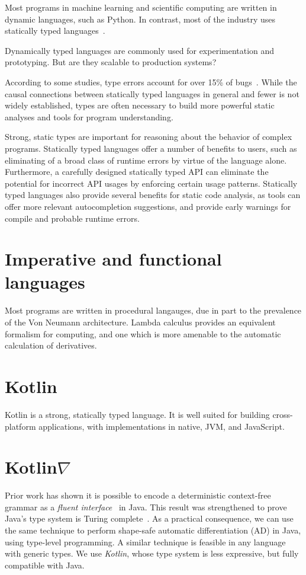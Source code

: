 \documentclass[12pt,initial,twoside,maitrise]{dms}
\numberwithin{equation}{section}
\numberwithin{table}{chapter}
\numberwithin{figure}{chapter}
\begin{document}
Most programs in machine learning and scientific computing are written in dynamic languages, such as Python. In contrast, most of the industry uses statically typed languages~\cite{github}.

Dynamically typed languages are commonly used for experimentation and prototyping. But are they scalable to production systems?

According to some studies, type errors account for over 15\% of bugs~\cite{gao2017type}. While the causal connections between statically typed languages in general and fewer is not widely established, types are often necessary to build more powerful static analyses and tools for program understanding.

Strong, static types are important for reasoning about the behavior of complex programs. Statically typed languages offer a number of benefits to users, such as eliminating of a broad class of runtime errors by virtue of the language alone. Furthermore, a carefully designed statically typed API can eliminate the potential for incorrect API usages by enforcing certain usage patterns. Statically typed languages also provide several benefits for static code analysis, as tools can offer more relevant autocompletion suggestions, and provide early warnings for compile and probable runtime errors.

\section{Imperative and functional languages}

Most programs are written in procedural langauges, due in part to the prevalence of the Von Neumann architecture. Lambda calculus provides an equivalent formalism for computing, and one which is more amenable to the automatic calculation of derivatives.

\section{Kotlin}

Kotlin is a strong, statically typed language. It is well suited for building cross-platform applications, with implementations in native, JVM, and JavaScript.

\section{Kotlin$\nabla$}

Prior work has shown it is possible to encode a deterministic context-free grammar as a \textit{fluent interface}~\cite{gil2016formal} in Java. This result was strengthened to prove Java's type system is Turing complete~\cite{Grigore:2017:JGT:3009837.3009871}. As a practical consequence, we can use the same technique to perform shape-safe automatic differentiation (AD) in Java, using type-level programming. A similar technique is feasible in any language with generic types. We use \textit{Kotlin}, whose type system is less expressive, but fully compatible with Java.
\end{document}
